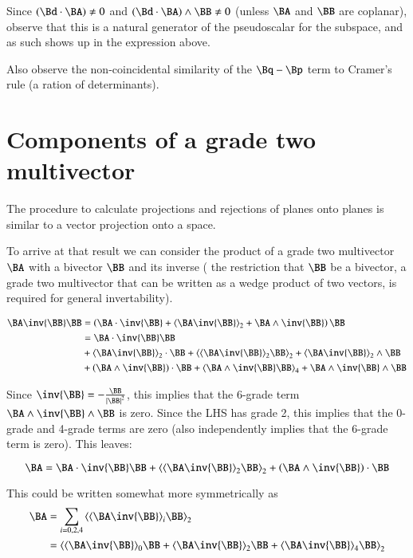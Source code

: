 Since $(\Bd \cdot \BA) \ne 0$ and $(\Bd \cdot \BA) \wedge \BB \ne 0$ (unless $\BA$ and $\BB$ are coplanar), observe that this is a natural generator of the pseudoscalar for the subspace, and as such shows up in the expression above.

Also observe the non-coincidental similarity of the $\Bq-\Bp$ term to Cramer's rule (a ration of determinants).

\section{Components of a grade two multivector }

The procedure to calculate projections and rejections of planes onto planes is similar to a vector projection onto a space.

To arrive at that result we can consider the product of a grade two multivector $\BA$ with a bivector $\BB$ and its inverse (
the restriction that $\BB$ be a bivector, a grade two multivector that can be written as a wedge product of two vectors, is required for general invertability).

\begin{align*}
\BA\inv{\BB}\BB 
&= \left(\BA \cdot \inv{\BB} + \gpgradetwo{ \BA \inv{\BB} } + \BA \wedge \inv{\BB}\right) \BB \\
&= 
\BA \cdot \inv{\BB} \BB \\
&
+\gpgradetwo{ \BA \inv{\BB} } \cdot \BB 
+\gpgradetwo{ \gpgradetwo{ \BA \inv{\BB} } \BB }
+\gpgradetwo{ \BA \inv{\BB} } \wedge \BB \\
&
+\left(\BA \wedge \inv{\BB}\right) \cdot \BB 
+\gpgradefour{\BA \wedge \inv{\BB} \BB}
+\BA \wedge \inv{\BB} \wedge \BB \\
\end{align*}

Since $\inv{\BB} = -\frac{\BB}{{\Abs{\BB}}^2}$, this implies that the 6-grade term $\BA \wedge \inv{\BB} \wedge \BB$ is zero.  Since the LHS has grade 2, this implies that the 0-grade and 4-grade terms are zero (also independently implies that the 6-grade term is zero).  This leaves:

\begin{equation}\label{eqn:bivector:bivectorprojbivector}
\BA
= 
\BA \cdot \inv{\BB} \BB \\
+\gpgradetwo{\gpgradetwo{\BA\inv{\BB}} \BB}
+\left(\BA \wedge \inv{\BB}\right) \cdot \BB 
\end{equation}

This could be written somewhat more symmetrically as
\begin{align*}
\BA
&=\sum_{i=0,2,4}\gpgradetwo{\gpgrade{\BA \inv{\BB}}{i} \BB} \\
&= \gpgradetwo{ \gpgradezero{\BA \inv{\BB}} \BB +\gpgradetwo{\BA \inv{\BB}} \BB +\gpgradefour{\BA \inv{\BB}} \BB } \\
\end{align*}

